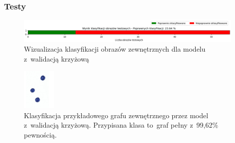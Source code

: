 \begin{frame}
    \frametitle{Testy}

    \begin{figure}[ht]
        \centering
        \includegraphics[width=11cm]{../thesis/resources/tests/images/v3/crossvalid_bar.png}
        \caption{Wizualizacja klasyfikacji obrazów zewnętrznych dla modelu z~walidacją krzyżową}
    \end{figure}
    
    \begin{figure}[ht]
        \centering
        \includegraphics[height=2cm]{../graph_classification/test_graphs/drawn/empty-1.png}
        \caption{Klasyfikacja przykładowego grafu zewnętrznego przez model z~walidacją krzyżową.
            Przypisana klasa to~graf pełny z~99,62\% pewnością.}
    \end{figure}

\end{frame}


